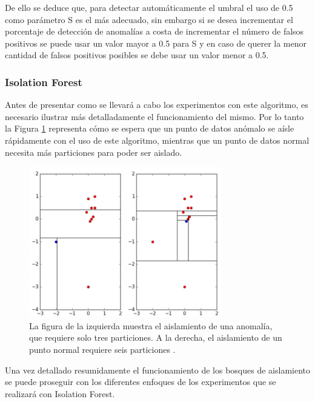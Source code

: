\vspace{5mm} %

De ello se deduce que, para detectar autom\'{a}ticamente el umbral el uso de 0.5 como par\'{a}metro S es el m\'{a}s adecuado, sin embargo si se desea incrementar el porcentaje de detecci\'{o}n de anomal\'{i}as a costa de incrementar el n\'{u}mero de falsos positivos se puede usar un valor mayor a 0.5 para S y en caso de querer la menor cantidad de falsos positivos posibles se debe usar un valor menor a 0.5.

\subsubsection{Isolation Forest}

Antes de presentar como se llevar\'{a} a cabo los experimentos con este algoritmo, es necesario ilustrar m\'{a}s detalladamente el funcionamiento del mismo. Por lo tanto la Figura \ref{fig:isolartion-forest} representa c\'{o}mo se espera que un punto de datos anómalo se aísle rápidamente con el uso de este algoritmo, mientras que un punto de datos normal necesita más particiones para poder ser aislado.

\begin{figure}[h!]
  \begin{center}	\includegraphics[width=0.75\textwidth, frame]{imagenes/Cap5/isolation-forest}
  \caption{La figura de la izquierda muestra el aislamiento de una anomalía, que requiere solo tres particiones. A la derecha, el aislamiento de un punto normal requiere seis particiones \protect\cite{Reference60}.} 
  \label{fig:isolartion-forest}
  \end{center}
\end{figure}

Una vez detallado resumidamente el funcionamiento de los bosques de aislamiento se puede proseguir con los diferentes enfoques de los experimentos que se realizar\'{a} con Isolation Forest.


